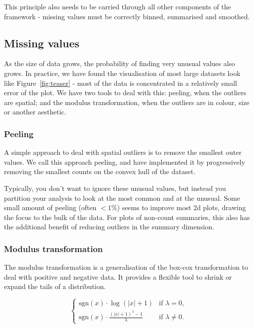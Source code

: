 \documentclass[journal]{vgtc}                %
\begin{document}
This principle also needs to be carried through all other components of the framework - missing values must be correctly binned, summarised and smoothed.

\subsection{Missing values}

As the size of data grows, the probability of finding very unusual values also grows. In practice, we have found the visualisation of most large datasets look like Figure~\ref{fig:teaser} - most of the data is concentrated in a relatively small error of the plot. We have two tools to deal with this: peeling, when the outliers are spatial; and the modulus transformation, when the outliers are in colour, size or another aesthetic.

\subsubsection{Peeling}

A simple approach to deal with spatial outliers is to remove the smallest outer values. We call this approach peeling, and have implemented it by progressively removing the smallest counts on the convex hull of the dataset.

Typically, you don't want to ignore these unusual values, but instead you partition your analysis to look at the most common and at the unusual. Some small amount of peeling (often $< 1\%$) seems to improve most 2d plots, drawing the focus to the bulk of the data.  For plots of non-count summaries, this also has the additional benefit of reducing outliers in the summary dimension. 

\subsubsection{Modulus transformation}
\label{sub:transform}

The modulus transformation \citep{john:1980} is a generalisation of the box-cox transformation \citep{box:1964} to deal with positive and negative data. It provides a flexible tool to shrink or expand the tails of a distribution.

\begin{equation}
\begin{cases} 
  \text{sgn}(x) \cdot \log(|x| + 1) & \text{if $\lambda = 0$,} \\
  \text{sgn}(x) \cdot \frac{(|x| + 1)^\lambda - 1}{\lambda} &\text{if $\lambda \ne 0$.}
\end{cases}
\end{equation}
\end{document}
